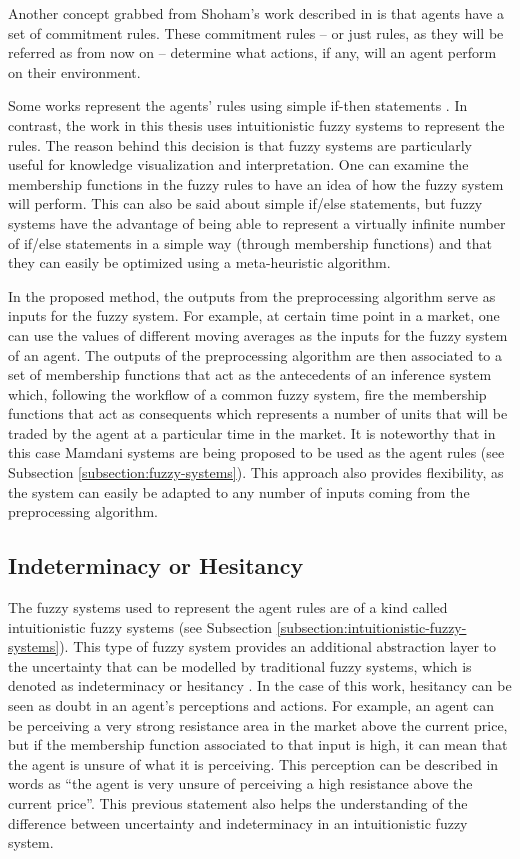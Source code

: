 Another concept grabbed from Shoham's work described in \cite{Shoham1993} is
that agents have a set of commitment rules. These commitment rules -- or just
rules, as they will be referred as from now on -- determine what actions, if
any, will an agent perform on their environment.

Some works represent the agents' rules using simple if-then statements
\cite{Niazi2011} \cite{Pellizzari2007}. In contrast, the work in this thesis
uses intuitionistic fuzzy systems to represent the rules. The reason behind this
decision is that fuzzy systems are particularly useful for knowledge
visualization and interpretation. One can examine the membership functions in
the fuzzy rules to have an idea of how the fuzzy system will perform. This can
also be said about simple if/else statements, but fuzzy systems have the
advantage of being able to represent a virtually infinite number of if/else
statements in a simple way (through membership functions) and that they can
easily be optimized using a meta-heuristic algorithm.

In the proposed method, the outputs from the preprocessing algorithm serve as
inputs for the fuzzy system. For example, at certain time point in a market, one
can use the values of different moving averages as the inputs for the fuzzy
system of an agent. The outputs of the preprocessing algorithm are then
associated to a set of membership functions that act as the antecedents of an
inference system which, following the workflow of a common fuzzy system, fire
the membership functions that act as consequents which represents a number of
units that will be traded by the agent at a particular time in the market. It is
noteworthy that in this case Mamdani systems are being proposed to be used as
the agent rules (see Subsection \ref{subsection:fuzzy-systems}). This approach
also provides flexibility, as the system can easily be adapted to any number of
inputs coming from the preprocessing algorithm.

\subsection{Indeterminacy or Hesitancy}
\label{subsection:indeterminacy-or-hesitancy}

The fuzzy systems used to represent the agent rules are of a kind called
intuitionistic fuzzy systems (see Subsection
\ref{subsection:intuitionistic-fuzzy-systems}). This type of fuzzy system
provides an additional abstraction layer to the uncertainty that can be modelled
by traditional fuzzy systems, which is denoted as indeterminacy or hesitancy
\cite{Atanassov1986}. In the case of this work, hesitancy can be seen as doubt
in an agent's perceptions and actions. For example, an agent can be perceiving a
very strong resistance area in the market above the current price, but if the
membership function associated to that input is high, it can mean that the agent
is unsure of what it is perceiving. This perception can be described in words as
``the agent is very unsure of perceiving a high resistance above the current
price''. This previous statement also helps the understanding of the difference
between uncertainty and indeterminacy in an intuitionistic fuzzy system.

